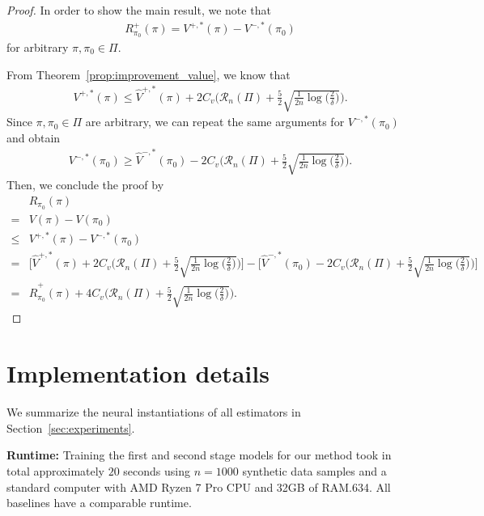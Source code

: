 \documentclass{article} %
\theoremstyle{plain}
\theoremstyle{definition}
\theoremstyle{remark}
\begin{document}
\begin{proof}

In order to show the main result, we note that
\begin{align}
    R_{\pi_0}^{+}(\pi)=V^{+,*}(\pi)-V^{-,*}(\pi_0)
\end{align}
for arbitrary $\pi, \pi_0 \in \Pi$.

From Theorem~\ref{prop:improvement_value}, we know that
\begin{align}
    V^{+,*}(\pi) \leq \hat{V}^{+,*}(\pi) + 2C_v \Big( \mathcal{R}_n(\Pi) + \frac{5}{2}\sqrt{\frac{1}{2n}\log\Big(\frac{2}{\delta}\Big)}\Big).
\end{align}
Since $\pi, \pi_0\in\Pi$ are arbitrary, we can repeat the same arguments for $V^{-,*}(\pi_0)$ and obtain
\begin{align}
    V^{-,*}(\pi_0) \geq \hat{V}^{-,*}(\pi_0) - 2C_v \Big( \mathcal{R}_n(\Pi) + \frac{5}{2}\sqrt{\frac{1}{2n}\log\Big(\frac{2}{\delta}\Big)}\Big).
\end{align}
Then, we conclude the proof by
\begin{align}
    &R_{\pi_0}(\pi)\\
    =& V(\pi)-V(\pi_0)\\
    \leq& V^{+,*}(\pi)-V^{-,*}(\pi_0)\\
    =& \Big[ \hat{V}^{+,*}(\pi) + 2C_v \Big( \mathcal{R}_n(\Pi) + \frac{5}{2}\sqrt{\frac{1}{2n}\log\Big(\frac{2}{\delta}\Big)}\Big)\Big]
    - \Big[ \hat{V}^{-,*}(\pi_0) - 2C_v \Big( \mathcal{R}_n(\Pi) + \frac{5}{2}\sqrt{\frac{1}{2n}\log\Big(\frac{2}{\delta}\Big)}\Big) \Big]\\
    =& \hat{R}_{\pi_0}^{+}(\pi) +4 C_v \Big(\mathcal{R}_n(\Pi) + \frac{5}{2}\sqrt{\frac{1}{2n}\log\Big(\frac{2}{\delta}\Big)}\Big).
    \end{align}

\end{proof}




\clearpage


\section{Implementation details}\label{appendix:implementation_details}
We summarize the neural instantiations of all estimators in Section~\ref{sec:experiments}.

\textbf{Runtime:} Training the first and second stage models for our method took in total approximately $20$ seconds using $n=1000$ synthetic data samples and a standard computer with AMD Ryzen 7 Pro CPU and 32GB of RAM.634. All baselines have a comparable runtime.
\end{document}
